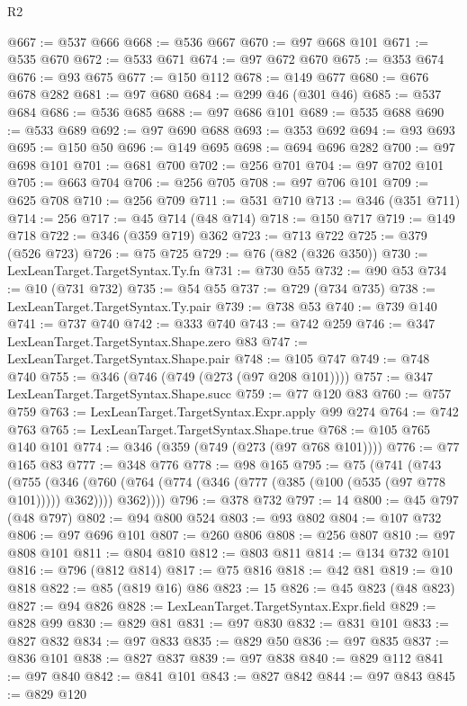 \begin{lexlean}{R2}
\begin{coremodule}
@667 := @537 @666
@668 := @536 @667
@670 := @97 @668 @101
@671 := @535 @670
@672 := @533 @671
@674 := @97 @672 @670
@675 := @353 @674
@676 := @93 @675
@677 := @150 @112
@678 := @149 @677
@680 := @676 @678 @282
@681 := @97 @680
@684 := @299 @46 (@301 @46)
@685 := @537 @684
@686 := @536 @685
@688 := @97 @686 @101
@689 := @535 @688
@690 := @533 @689
@692 := @97 @690 @688
@693 := @353 @692
@694 := @93 @693
@695 := @150 @50
@696 := @149 @695
@698 := @694 @696 @282
@700 := @97 @698 @101
@701 := @681 @700
@702 := @256 @701
@704 := @97 @702 @101
@705 := @663 @704
@706 := @256 @705
@708 := @97 @706 @101
@709 := @625 @708
@710 := @256 @709
@711 := @531 @710
@713 := @346 (@351 @711)
@714 := 256
@717 := @45 @714 (@48 @714)
@718 := @150 @717
@719 := @149 @718
@722 := @346 (@359 @719) @362
@723 := @713 @722
@725 := @379 (@526 @723)
@726 := @75 @725
@729 := @76 (@82 (@326 @350))
@730 := LexLeanTarget.TargetSyntax.Ty.fn
@731 := @730 @55
@732 := @90 @53
@734 := @10 (@731 @732)
@735 := @54 @55
@737 := @729 (@734 @735)
@738 := LexLeanTarget.TargetSyntax.Ty.pair
@739 := @738 @53
@740 := @739 @140
@741 := @737 @740
@742 := @333 @740
@743 := @742 @259
@746 := @347 LexLeanTarget.TargetSyntax.Shape.zero @83
@747 := LexLeanTarget.TargetSyntax.Shape.pair
@748 := @105 @747
@749 := @748 @740
@755 := @346 (@746 (@749 (@273 (@97 @208 @101))))
@757 := @347 LexLeanTarget.TargetSyntax.Shape.succ
@759 := @77 @120 @83
@760 := @757 @759
@763 := LexLeanTarget.TargetSyntax.Expr.apply @99 @274
@764 := @742 @763
@765 := LexLeanTarget.TargetSyntax.Shape.true
@768 := @105 @765 @140 @101
@774 := @346 (@359 (@749 (@273 (@97 @768 @101))))
@776 := @77 @165 @83
@777 := @348 @776
@778 := @98 @165
@795 := @75
    (@741
      (@743
        (@755
          (@346
            (@760 (@764 (@774 (@346 (@777 (@385 (@100 (@535 (@97 @778 @101))))) @362))))
            @362))))
@796 := @378 @732
@797 := 14
@800 := @45 @797 (@48 @797)
@802 := @94 @800 @524
@803 := @93 @802
@804 := @107 @732
@806 := @97 @696 @101
@807 := @260 @806
@808 := @256 @807
@810 := @97 @808 @101
@811 := @804 @810
@812 := @803 @811
@814 := @134 @732 @101
@816 := @796 (@812 @814)
@817 := @75 @816
@818 := @42 @81
@819 := @10 @818
@822 := @85 (@819 @16) @86
@823 := 15
@826 := @45 @823 (@48 @823)
@827 := @94 @826
@828 := LexLeanTarget.TargetSyntax.Expr.field
@829 := @828 @99
@830 := @829 @81
@831 := @97 @830
@832 := @831 @101
@833 := @827 @832
@834 := @97 @833
@835 := @829 @50
@836 := @97 @835
@837 := @836 @101
@838 := @827 @837
@839 := @97 @838
@840 := @829 @112
@841 := @97 @840
@842 := @841 @101
@843 := @827 @842
@844 := @97 @843
@845 := @829 @120

\end{coremodule}
\end{lexlean}
